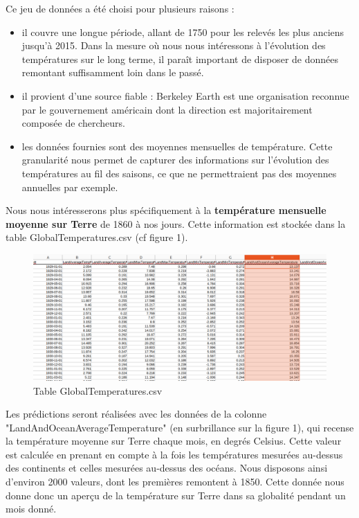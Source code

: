 \documentclass[french]{article}
\begin{document}
    Ce jeu de données a été choisi pour plusieurs raisons :
    \begin{itemize}
        \item il couvre une longue période, allant de 1750 pour les relevés les plus anciens jusqu'à 2015. Dans la mesure où nous nous intéressons à l'évolution des températures sur le long terme, il paraît important de disposer de données remontant suffisamment loin dans le passé.
        \item il provient d'une source fiable : Berkeley Earth est une organisation reconnue par le gouvernement américain dont la direction est majoritairement composée de chercheurs.
        \item les données fournies sont des moyennes mensuelles de température. Cette granularité nous permet de capturer des informations sur l'évolution des températures au fil des saisons, ce que ne permettraient pas des moyennes annuelles par exemple.
    \end{itemize}
    
    Nous nous intéresserons  plus spécifiquement à la \textbf{température mensuelle moyenne sur Terre} de 1860 à nos jours. Cette information est stockée dans la table GlobalTemperatures.csv (cf figure 1).
    
    \begin{figure}[h!]
        \includegraphics[width=12cm]{dataset}
        \centering
        \caption{Table GlobalTemperatures.csv}
        \centering
    \end{figure}

    Les prédictions seront réalisées avec les données de la colonne "LandAndOceanAverageTemperature" (en surbrillance sur la figure 1), qui recense la température moyenne sur Terre chaque mois, en degrés Celsius. Cette valeur est calculée en prenant en compte à la fois les températures mesurées au-dessus des continents et celles mesurées au-dessus des océans. Nous disposons ainsi d'environ 2000 valeurs, dont les premières remontent à 1850. Cette donnée nous donne donc un aperçu de la température sur Terre dans sa globalité pendant un mois donné.
\end{document}
